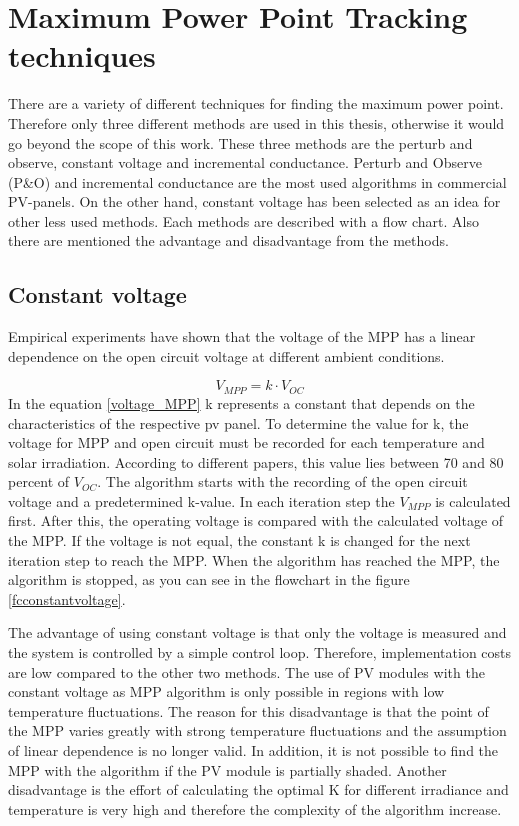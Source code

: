 \section{Maximum Power Point Tracking techniques\label{MPPTalgo}}

There are a variety of different techniques for finding the maximum power point. Therefore only three different methods are used in this thesis, otherwise it would go beyond the scope of this work. These three methods are the perturb and observe, constant voltage and incremental conductance. Perturb and Observe (P\&O) and incremental conductance are the most used algorithms in commercial PV-panels. On the other hand, constant voltage has been selected as an idea for other less used methods. Each methods are described with a flow chart. Also there are mentioned the advantage and disadvantage from the methods.

\subsection{Constant voltage}
Empirical experiments have shown that the voltage of the MPP has a linear dependence on the open circuit voltage at different ambient conditions.

\begin{equation} \label{voltage_MPP}
V_{MPP} = k \cdot V_{OC}	
\end{equation} 
In the equation \ref{voltage_MPP} k represents a constant that depends on the characteristics of the respective pv panel. To determine the value for k, the voltage for MPP and open circuit must be recorded for each temperature and solar irradiation. According to different papers, this value lies between 70 and 80 percent of $V_{OC}$\cite{MPPTResearch}. The algorithm starts with the recording of the open circuit voltage and a predetermined k-value. In each iteration step the $V_{MPP}$ is calculated first. After this, the operating voltage is compared with the calculated voltage of the MPP. If the voltage is not equal, the constant k is changed for the next iteration step to reach the MPP. When the algorithm has reached the MPP, the algorithm is stopped, as you can see in the flowchart in the figure \ref{fcconstantvoltage}\cite{flowchartVC}. 

The advantage of using constant voltage is that only the voltage is measured and the system is controlled by a simple control loop. Therefore, implementation costs are low compared to the other two methods. The use of PV modules with the constant voltage as MPP algorithm is only possible in regions with low temperature fluctuations. The reason for this disadvantage is that the point of the MPP varies greatly with strong temperature fluctuations and the assumption of linear dependence is no longer valid. In addition, it is not possible to find the MPP with the algorithm if the PV module is partially shaded. Another disadvantage is the effort of calculating the optimal K for different irradiance and temperature is very high and therefore the complexity of the algorithm increase\cite{flowchartVC}.

